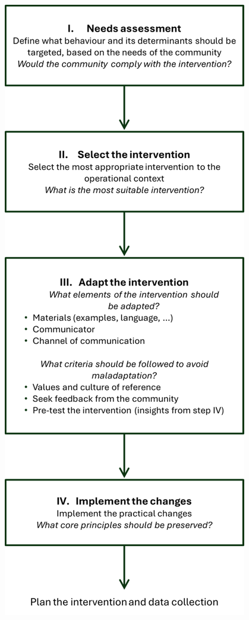 \documentclass[authordate, empirical]{jote-new-article}
\begin{document}
	\begin{figure}
		\includegraphics[width=\linewidth]{media/image1.png}

		\caption{}

		\label{fig:rId8}


	\end{figure}
\end{document}
